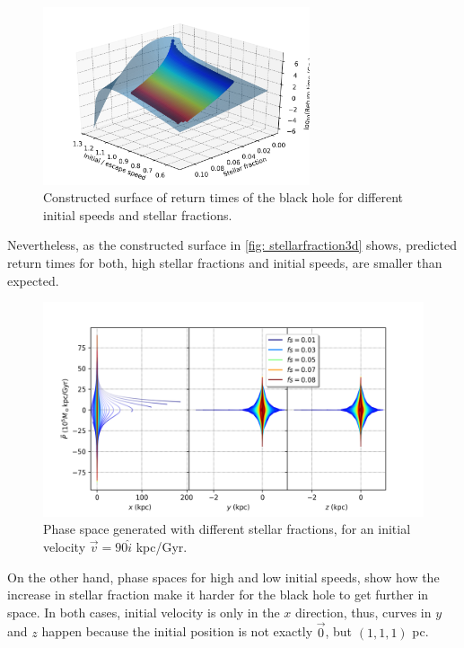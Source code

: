 	\begin{figure}[h]
		\centering
		\includegraphics[width = 0.7\textwidth]{"../Files/Week 10/surface"}
		\caption{Constructed surface of return times of the black hole for different initial speeds and stellar fractions.}
		\label{fig: stellarfraction3d}
	\end{figure}

	Nevertheless, as the constructed surface in \autoref{fig: stellarfraction3d} shows, predicted return times for both, high stellar fractions and initial speeds, are smaller than expected.
	
	\begin{figure}[h!]
		\centering
		\includegraphics[width = 0.9\linewidth]{"../Files/Week 9/PhaseSpace_escape"}
		\caption{Phase space generated with different stellar fractions, for an initial velocity $\vec{v} = 90\hat{i}$ kpc/Gyr.}
		\label{fig: escapePhaseSpace}
	\end{figure}

	On the other hand, phase spaces for high and low initial speeds, show how the increase in stellar fraction make it harder for the black hole to get further in space. In both cases, initial velocity is only in the $x$ direction, thus, curves in $y$ and $z$ happen because the initial position is not exactly $\vec{0}$, but $(1, 1, 1)$ pc.
	
